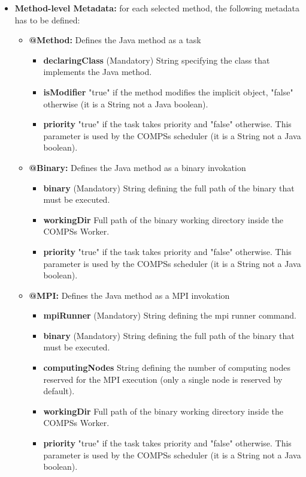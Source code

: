 \begin{itemize}
 \item \textbf{Method-level Metadata:} for each selected method, the following metadata has to be defined:
       \begin{itemize}
         \item \textbf{@Method:} Defines the Java method as a task 
		\begin{itemize}
		        \item \textbf{declaringClass} (Mandatory) String specifying the class that implements the Java method.
			\item \textbf{isModifier} "true" if the method modifies the implicit object, "false" otherwise 
			(it is a String not a Java boolean).
			\item \textbf{priority} "true" if the task takes priority and "false" otherwise. This parameter is used
			by the COMPSs scheduler (it is a String not a Java boolean).
		\end{itemize}
		
	 \item \textbf{@Binary:} Defines the Java method as a binary invokation
	        \begin{itemize}
		        \item \textbf{binary} (Mandatory) String defining the full path of the binary that must be executed.
			\item \textbf{workingDir} Full path of the binary working directory inside the COMPSs Worker.
			\item \textbf{priority} "true" if the task takes priority and "false" otherwise. This parameter is used
			by the COMPSs scheduler (it is a String not a Java boolean).
		\end{itemize}
		
	\item \textbf{@MPI:} Defines the Java method as a MPI invokation
	        \begin{itemize}
	        	\item \textbf{mpiRunner} (Mandatory) String defining the mpi runner command. 
		        \item \textbf{binary} (Mandatory) String defining the full path of the binary that must be executed.
		        \item \textbf{computingNodes} String defining the number of computing nodes reserved for the MPI execution
		        (only a single node is reserved by default).
			\item \textbf{workingDir} Full path of the binary working directory inside the COMPSs Worker.
			\item \textbf{priority} "true" if the task takes priority and "false" otherwise. This parameter is used
			by the COMPSs scheduler (it is a String not a Java boolean).
		\end{itemize}
		

\end{itemize}
\end{itemize}
